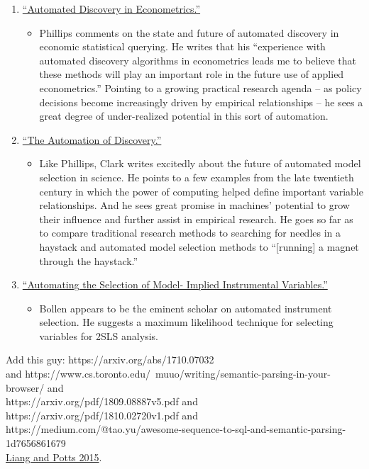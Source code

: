 \documentclass[pageno]{jpaper}
\begin{document}
\begin{enumerate}
\begin{itemize}
	\end{itemize}
	\item \href{https://doi.org/10.1017/S0266466605050024}{“Automated Discovery in Econometrics.”} 
	\begin{itemize}
		\item Phillips comments on the state and future of automated discovery in economic statistical querying. He writes that his “experience with automated discovery algorithms in econometrics leads me to believe that these methods will play an important role in the future use of applied econometrics.” Pointing to a growing practical research agenda – as policy decisions become increasingly driven by empirical relationships – he sees a great degree of under-realized potential in this sort of automation.\\
	\end{itemize}
	\item  \href{https://doi.org/10.1162/001152604772746710}{“The Automation of Discovery.”} 
	\begin{itemize}
		\item Like Phillips, Clark writes excitedly about the future of automated model selection in science. He points to a few examples from the late twentieth century in which the power of computing helped define important variable relationships. And he sees great promise in machines’ potential to grow their influence and further assist in empirical research. He goes so far as to compare traditional research methods to searching for needles in a haystack and automated model selection methods to “[running] a magnet through the haystack.”\\
	\end{itemize}
	\item \href{https://doi.org/10.1177/0049124103260341}{“Automating the Selection of Model-
Implied Instrumental Variables.”} 
	\begin{itemize}
		\item Bollen appears to be the eminent scholar on automated instrument selection. He suggests a maximum likelihood technique for selecting variables for 2SLS analysis.\\
	\end{itemize}
\end{enumerate}
 
Add this guy: https://arxiv.org/abs/1710.07032\\
and
https://www.cs.toronto.edu/~muuo/writing/semantic-parsing-in-your-browser/ and
\\
https://arxiv.org/pdf/1809.08887v5.pdf and \\
https://arxiv.org/pdf/1810.02720v1.pdf and
\\ https://medium.com/@tao.yu/awesome-sequence-to-sql-and-semantic-parsing-1d7656861679 \\
\href{https://www.annualreviews.org/doi/pdf/10.1146/annurev-linguist-030514-125312}{Liang and Potts 2015}.
 
\end{document}
